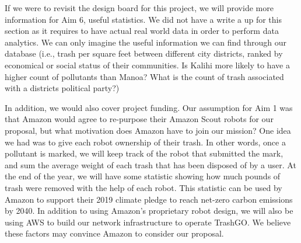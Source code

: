 \documentclass[
  journal=small,
  manuscript=article-type,  %
  year=2022,
  volume=1,
]{cup-journal}
\begin{document}
If we were to revisit the design board for this project, we will provide more information for Aim 6, useful statistics. We did not have a write a up for this section as it requires to have actual real world data in order to perform data analytics. We can only imagine the useful information we can find through our database (i.e., trash per square feet between different city districts, ranked by economical or social status of their communities. Is Kalihi more likely to have a higher count of pollutants than Manoa? What is the count of trash associated with a districts political party?) 

In addition, we would also cover project funding. Our assumption for Aim 1 was that Amazon would agree to re-purpose their Amazon Scout robots for our proposal, but what motivation does Amazon have to join our mission? One  idea we had was to give each robot ownership of their trash. In other words, once a pollutant is marked, we will keep track of the robot that submitted the mark, and sum the average weight of each trash that has been disposed of by a user. At the end of the year, we will have some statistic showing how much pounds of trash were removed with the help of each robot. This statistic can be used by Amazon to support their 2019 climate pledge to reach net-zero carbon emissions by 2040. In addition to using Amazon's proprietary robot design, we will also be using AWS to build our network infrastructure to operate TrashGO. We believe these factors may convince Amazon to consider our proposal. 
\end{document}
